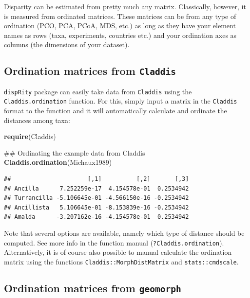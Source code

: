 \documentclass[]{book}
\newenvironment{Shaded}{\begin{snugshade}}{\end{snugshade}}
\newcommand{\KeywordTok}[1]{\textcolor[rgb]{0.13,0.29,0.53}{\textbf{#1}}}
\newcommand{\NormalTok}[1]{#1}
\theoremstyle{definition}
\theoremstyle{definition}
\theoremstyle{remark}
\begin{document}
Disparity can be estimated from pretty much any matrix. Classically,
however, it is measured from ordinated matrices. These matrices can be
from any type of ordination (PCO, PCA, PCoA, MDS, etc.) as long as they
have your element names as rows (taxa, experiments, countries etc.) and
your ordination axes as columns (the dimensions of your dataset).

\subsection{\texorpdfstring{Ordination matrices from
\texttt{Claddis}}{Ordination matrices from Claddis}}\label{ordination-matrices-from-claddis}

\texttt{dispRity} package can easily take data from \texttt{Claddis}
using the \texttt{Claddis.ordination} function. For this, simply input a
matrix in the \texttt{Claddis} format to the function and it will
automatically calculate and ordinate the distances among taxa:

\begin{Shaded}
\begin{Highlighting}[]
\KeywordTok{require}\NormalTok{(Claddis)}

\NormalTok{## Ordinating the example data from Claddis}
\KeywordTok{Claddis.ordination}\NormalTok{(Michaux1989) }
\end{Highlighting}
\end{Shaded}

\begin{verbatim}
##                      [,1]          [,2]       [,3]
## Ancilla      7.252259e-17  4.154578e-01  0.2534942
## Turrancilla -5.106645e-01 -4.566150e-16 -0.2534942
## Ancillista   5.106645e-01 -8.153839e-16 -0.2534942
## Amalda      -3.207162e-16 -4.154578e-01  0.2534942
\end{verbatim}

Note that several options are available, namely which type of distance
should be computed. See more info in the function manual
(\texttt{?Claddis.ordination}). Alternatively, it is of course also
possible to manual calculate the ordination matrix using the functions
\texttt{Claddis::MorphDistMatrix} and \texttt{stats::cmdscale}.

\subsection{\texorpdfstring{Ordination matrices from
\texttt{geomorph}}{Ordination matrices from geomorph}}\label{ordination-matrices-from-geomorph}
\end{document}
